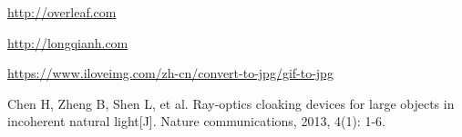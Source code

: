 \documentclass{article}
\begin{document}
\newpage
\begin{thebibliography}{9} %
  \url{http://overleaf.com}

  \url{http://longqianh.com}

  \url{https://www.iloveimg.com/zh-cn/convert-to-jpg/gif-to-jpg }

Chen H, Zheng B, Shen L, et al. Ray-optics cloaking devices for large objects in incoherent natural light[J]. Nature communications, 2013, 4(1): 1-6.

\end{thebibliography}
\end{document}
